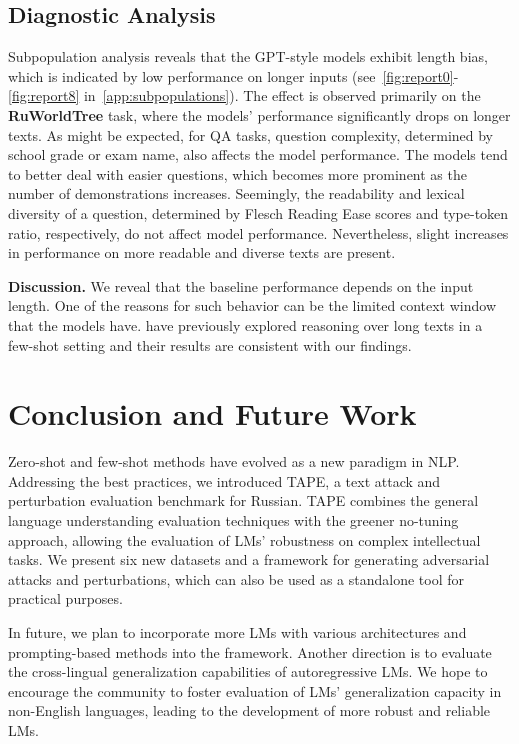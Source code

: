 \documentclass[11pt]{article}
\begin{document}
\subsection{Diagnostic Analysis}
Subpopulation analysis reveals that the GPT-style models exhibit length bias, which is indicated by low performance on longer inputs (see~\autoref{fig:report0}-\autoref{fig:report8} in~\autoref{app:subpopulations}). The effect is observed primarily on the \textbf{RuWorldTree} task, where the models' performance significantly drops on longer texts. As might be expected, for QA tasks, question complexity, determined by school grade or exam name, also affects the model performance. The models tend to better deal with easier questions, which becomes more prominent as the number of demonstrations increases. Seemingly, the readability and lexical diversity of a question, determined by Flesch Reading Ease scores and type-token ratio, respectively, do not affect model performance. Nevertheless, slight increases in performance on more readable and diverse texts are present.

\noindent\textbf{Discussion.} We reveal that the baseline performance depends on the input length. One of the reasons for such behavior can be the limited context window that the models have. \citet{alex2021raft} have previously explored reasoning over long texts in a few-shot setting and their results are consistent with our findings. 
 
\section{Conclusion and Future Work}
Zero-shot and few-shot methods have evolved as a new paradigm in NLP. Addressing the best practices, we introduced TAPE, a text attack and perturbation evaluation benchmark for Russian. TAPE combines the general language understanding evaluation techniques with the greener no-tuning approach, allowing the evaluation of LMs' robustness on complex intellectual tasks. We present six new datasets and a framework for generating adversarial attacks and perturbations, which can also be used as a standalone tool for practical purposes. 

In future, we plan to incorporate more LMs with various architectures and prompting-based methods into the framework. Another direction is to evaluate the cross-lingual generalization capabilities of autoregressive LMs. We hope to encourage the community to foster evaluation of LMs' generalization capacity in non-English languages, leading to the development of more robust and reliable LMs.
\end{document}
